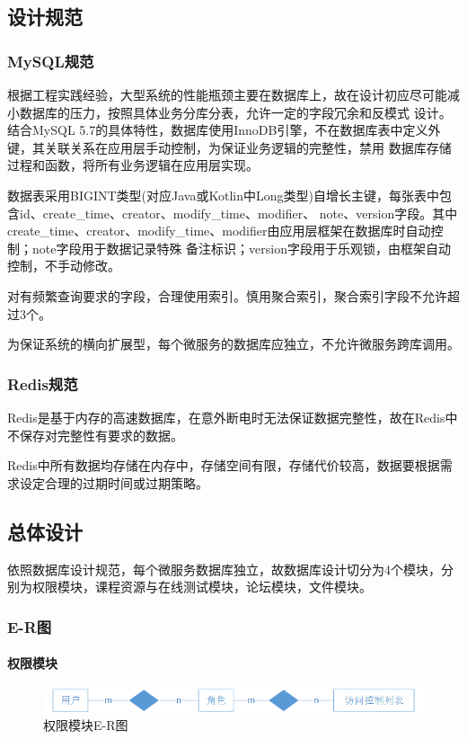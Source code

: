 \documentclass[titlepage,UTF8,linespread=1.5]{ctexart}
\begin{document}
\subsection{设计规范}
\subsubsection{MySQL规范}
根据工程实践经验，大型系统的性能瓶颈主要在数据库上，故在设计初应尽可能减小数据库的压力，按照具体业务分库分表，允许一定的字段冗余和反模式
设计。结合MySQL 5.7的具体特性，数据库使用InnoDB引擎，不在数据库表中定义外键，其关联关系在应用层手动控制，为保证业务逻辑的完整性，禁用
数据库存储过程和函数，将所有业务逻辑在应用层实现。\par
数据表采用BIGINT类型(对应Java或Kotlin中Long类型)自增长主键，每张表中包含id、create\_time、creator、modify\_time、modifier、
note、version字段。其中create\_time、creator、modify\_time、modifier由应用层框架在数据库时自动控制；note字段用于数据记录特殊
备注标识；version字段用于乐观锁，由框架自动控制，不手动修改。\par
对有频繁查询要求的字段，合理使用索引。慎用聚合索引，聚合索引字段不允许超过3个。\par
为保证系统的横向扩展型，每个微服务的数据库应独立，不允许微服务跨库调用。\par
\subsubsection{Redis规范}
Redis是基于内存的高速数据库，在意外断电时无法保证数据完整性，故在Redis中不保存对完整性有要求的数据。\par
Redis中所有数据均存储在内存中，存储空间有限，存储代价较高，数据要根据需求设定合理的过期时间或过期策略。\par

\subsection{总体设计}
依照数据库设计规范，每个微服务数据库独立，故数据库设计切分为4个模块，分别为权限模块，课程资源与在线测试模块，论坛模块，文件模块。\par
\subsubsection{E-R图}
\paragraph{权限模块}
\begin{figure}[H]
    \centering
    \includegraphics[width=140mm]{er-auth.png}
    \caption{权限模块E-R图}
    \label{fig:er-auth}
\end{figure}
\end{document}
